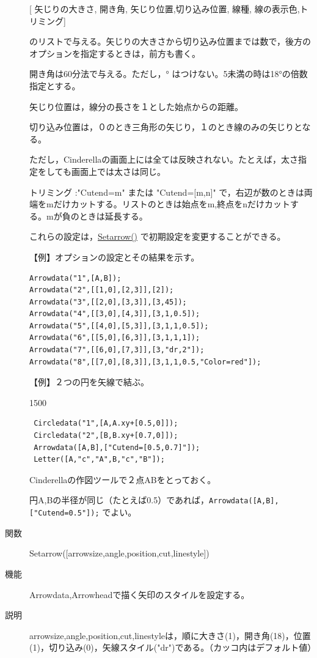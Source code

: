\documentclass[papersize,a4paper,12pt,uplatex]{jsarticle}
\begin{document}
\begin{description}
\hspace{10mm} [ 矢じりの大きさ, 開き角, 矢じり位置,切り込み位置, 線種, 線の表示色,トリミング] 

のリストで与える。矢じりの大きさから切り込み位置までは数で，後方のオプションを指定するときは，前方も書く。

開き角は60分法で与える。ただし，° はつけない。5未満の時は18°の倍数指定とする。

矢じり位置は，線分の長さを１とした始点からの距離。

切り込み位置は，０のとき三角形の矢じり，１のとき線のみの矢じりとなる。

ただし，Cinderellaの画面上には全ては反映されない。たとえば，太さ指定をしても画面上では太さは同じ。
 
トリミング :"Cutend=m" または "Cutend=[m,n]" で，右辺が数のときは両端をmだけカットする。リストのときは始点をm,終点をnだけカットする。mが負のときは延長する。

これらの設定は，\hyperlink{setarrow}{Setarrow()} で初期設定を変更することができる。

\vspace{\baselineskip}
【例】オプションの設定とその結果を示す。

\begin{verbatim}
Arrowdata("1",[A,B]);
Arrowdata("2",[[1,0],[2,3]],[2]);
Arrowdata("3",[[2,0],[3,3]],[3,45]);
Arrowdata("4",[[3,0],[4,3]],[3,1,0.5]);
Arrowdata("5",[[4,0],[5,3]],[3,1,1,0.5]);
Arrowdata("6",[[5,0],[6,3]],[3,1,1,1]);
Arrowdata("7",[[6,0],[7,3]],[3,"dr,2"]);
Arrowdata("8",[[7,0],[8,3]],[3,1,1,0.5,"Color=red"]);
\end{verbatim}
\hspace{20mm}

【例】２つの円を矢線で結ぶ。

\begin{layer}{150}{0}
\end{layer}
\hspace{20mm}

\begin{verbatim}
 Circledata("1",[A,A.xy+[0.5,0]]);
 Circledata("2",[B,B.xy+[0.7,0]]);
 Arrowdata([A,B],["Cutend=[0.5,0.7]"]);
 Letter([A,"c","A",B,"c","B"]);
\end{verbatim}
Cinderellaの作図ツールで２点ABをとっておく。

円A,Bの半径が同じ（たとえば0.5）であれば，\verb|Arrowdata([A,B],["Cutend=0.5"]);| でよい。

\vspace{\baselineskip}
\hypertarget{setarrow}{}
\item[関数]Setarrow([arrowsize,angle,position,cut,linestyle])
\item[機能]Arrowdata,Arrowheadで描く矢印のスタイルを設定する。
\item[説明]arrowsize,angle,position,cut,linestyleは，順に大きさ(1)，開き角(18)，位置(1)，切り込み(0)，矢線スタイル("dr")である。（カッコ内はデフォルト値）



\end{description}
\end{document}

